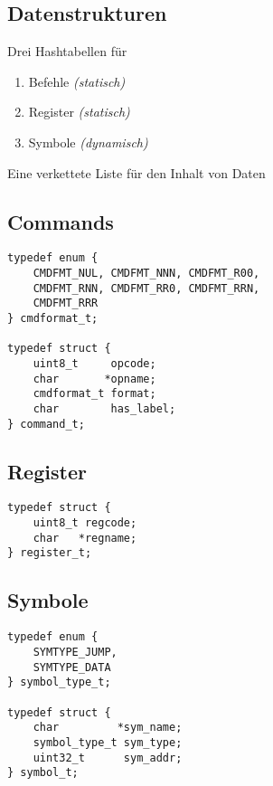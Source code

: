 \subsection{Datenstrukturen}

\begin{frame}{\insertsection}{\insertsubsection}
    Drei Hashtabellen für
    \begin{enumerate}
        \item Befehle \textit{(statisch)}
        \item Register \textit{(statisch)}
        \item Symbole \textit{(dynamisch)}
    \end{enumerate}
    Eine verkettete Liste für den Inhalt von Daten
\end{frame}

\subsection{Commands}

\begin{frame}[fragile]{\insertsubsection}
\begin{lstlisting}
typedef enum {
    CMDFMT_NUL, CMDFMT_NNN, CMDFMT_R00,
    CMDFMT_RNN, CMDFMT_RR0, CMDFMT_RRN,
    CMDFMT_RRR
} cmdformat_t;

typedef struct {
    uint8_t     opcode;
    char       *opname;
    cmdformat_t format;
    char        has_label;
} command_t;
\end{lstlisting}
\end{frame}

\subsection{Register}

\begin{frame}[fragile]{\insertsubsection}
\begin{lstlisting}
typedef struct {
    uint8_t regcode;
    char   *regname;
} register_t;
\end{lstlisting}
\end{frame}

\subsection{Symbole}

\begin{frame}[fragile]{\insertsubsection}
\begin{lstlisting}
typedef enum {
    SYMTYPE_JUMP,
    SYMTYPE_DATA
} symbol_type_t;

typedef struct {
    char         *sym_name;
    symbol_type_t sym_type;
    uint32_t      sym_addr;
} symbol_t;
\end{lstlisting}
\end{frame}

